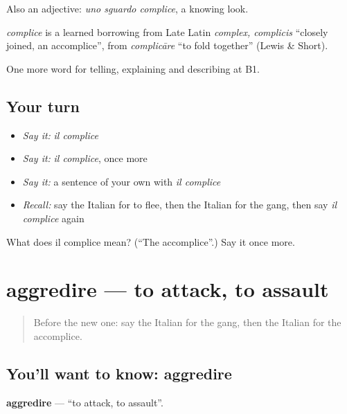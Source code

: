 Also an adjective: \emph{uno sguardo complice}, a knowing look.

\begin{cousinweb}
\emph{complice} is a learned borrowing from Late Latin \emph{complex, complicis} \textquotedblleft{}closely joined, an accomplice\textquotedblright{}, from \emph{complicāre} \textquotedblleft{}to fold together\textquotedblright{} (Lewis \& Short).
\end{cousinweb}

\begin{grammarlens}[title={What you've built}]
One more word for telling, explaining and describing at B1.
\end{grammarlens}

\subsection*{Your turn}
\begin{itemize}
\raggedright
  \item \emph{Say it:} \emph{il complice}
  \item \emph{Say it:} \emph{il complice}, once more
  \item \emph{Say it:} a sentence of your own with \emph{il complice}
  \item \emph{Recall:} say the Italian for to flee, then the Italian for the gang, then say \emph{il complice} again
\end{itemize}

\begin{tcolorbox}[breakable,colback=teal!4,colframe=teal!35!black,title={Before you move on}]
What does il complice mean? (\textquotedblleft{}The accomplice\textquotedblright{}.) Say it once more.
\end{tcolorbox}
\section[aggredire]{aggredire — to attack, to assault}

\label{lesson:IT-C298-aggredire}



\begin{quote}
Before the new one: say the Italian for the gang, then the Italian for the accomplice.
\end{quote}

\subsection*{You'll want to know: aggredire}
\textbf{aggredire} — \textquotedblleft{}to attack, to assault\textquotedblright{}.


